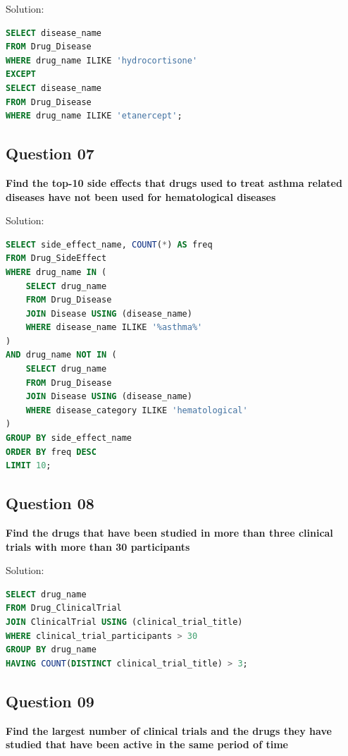\documentclass[12pt,a4paper]{article}
\begin{document}
Solution:
\begin{lstlisting}[language=SQL]
SELECT disease_name
FROM Drug_Disease
WHERE drug_name ILIKE 'hydrocortisone'
EXCEPT
SELECT disease_name
FROM Drug_Disease
WHERE drug_name ILIKE 'etanercept';
\end{lstlisting}

\subsection{Question 07}
\textbf{Find the top-10 side effects that drugs used to treat asthma related diseases have not been used for hematological diseases}

Solution:
\begin{lstlisting}[language=SQL]
SELECT side_effect_name, COUNT(*) AS freq
FROM Drug_SideEffect
WHERE drug_name IN (
    SELECT drug_name
    FROM Drug_Disease
    JOIN Disease USING (disease_name)
    WHERE disease_name ILIKE '%asthma%'
)
AND drug_name NOT IN (
    SELECT drug_name
    FROM Drug_Disease
    JOIN Disease USING (disease_name)
    WHERE disease_category ILIKE 'hematological'
)
GROUP BY side_effect_name
ORDER BY freq DESC
LIMIT 10;
\end{lstlisting}

\subsection{Question 08}
\textbf{Find the drugs that have been studied in more than three clinical trials with more than 30 participants}

Solution:
\begin{lstlisting}[language=SQL]
SELECT drug_name
FROM Drug_ClinicalTrial
JOIN ClinicalTrial USING (clinical_trial_title)
WHERE clinical_trial_participants > 30
GROUP BY drug_name
HAVING COUNT(DISTINCT clinical_trial_title) > 3;
\end{lstlisting}

\subsection{Question 09}
\textbf{Find the largest number of clinical trials and the drugs they have studied that have been active in the same period of time}
\end{document}
